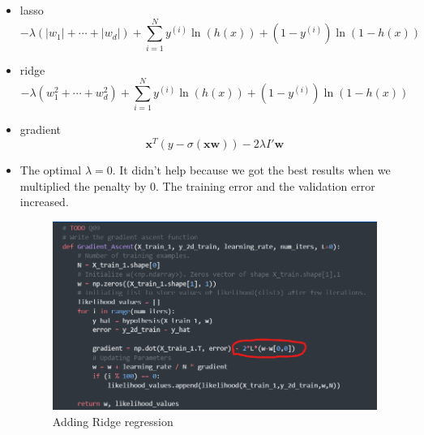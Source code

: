 \documentclass[12pt]{article}
\begin{document}
\begin{itemize}
	\item lasso \[ -\lambda\left(|w_1| + \cdots + |w_d|\right) + \sum\limits_{i=1}^{N} y^{(i)} \ln{(h(x))} + (1-y^{(i)})\ln{(1-h(x))} \]
	
	\item ridge \[ -\lambda\left(w_1^2 + \cdots + w_d^2\right) + \sum\limits_{i=1}^{N} y^{(i)} \ln{(h(x))} + (1-y^{(i)})\ln{(1-h(x))} \]
	
	\item gradient \[\textbf{x}^T(y-\sigma{(\textbf{x}\mathbf{w})}) - 2 \lambda I' \mathbf{w}\]
	
	\item The optimal $ \lambda = 0 $. It didn't help because we got the best results when we multiplied the penalty by 0. The training error and the validation error increased.
	\begin{figure}[H]
		\centering
		\includegraphics{images/ridgereg.png}
		\caption{Adding Ridge regression}
		\label{fig:4:ridgereg}
	\end{figure}
	

\end{itemize}
\end{document}
